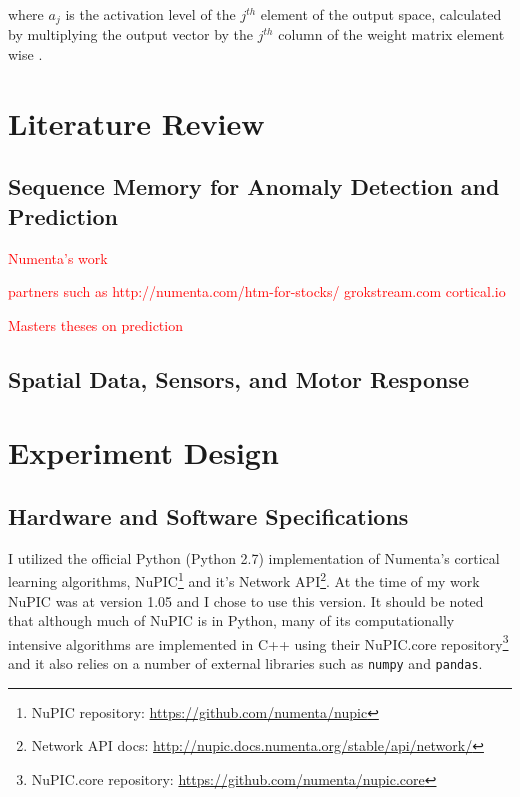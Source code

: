 \documentclass[oneside,12pt,openany]{book}
\begin{document}
	
	 \noindent where $a_{j}$ is the activation level of the $j^{th}$ element of the output space, calculated by multiplying the output vector by the $j^{th}$ column of the weight matrix element wise \cite{Dillon}. 
	
	\chapter{Literature Review}
	
	\section{Sequence Memory for Anomaly Detection and Prediction}
	
	\textcolor{red}{Numenta's work}
	
	\textcolor{red}{partners such as http://numenta.com/htm-for-stocks/ grokstream.com cortical.io}
	
	\textcolor{red}{Masters theses on prediction}
	
	\section{Spatial Data, Sensors, and Motor Response}
	
	\chapter{Experiment Design}
	
	\section{Hardware and Software Specifications}
	
	I utilized the official Python (Python 2.7) implementation of Numenta's cortical learning algorithms, NuPIC\footnote{NuPIC repository: \href{https://github.com/numenta/nupic}{\ttfamily https://github.com/numenta/nupic} } and it's Network API\footnote{Network API docs: \href{http://nupic.docs.numenta.org/stable/api/network/}{\ttfamily http://nupic.docs.numenta.org/stable/api/network/}}. At the time of my work NuPIC was at version 1.05 and I chose to use this version. It should be noted that although much of NuPIC is in Python, many of its computationally intensive algorithms are implemented in C++ using their NuPIC.core repository\footnote{NuPIC.core repository: \href{https://github.com/numenta/nupic.core}{\ttfamily https://github.com/numenta/nupic.core}} and it also relies on a number of external libraries such as \texttt{numpy} and \texttt{pandas}. 
	
\end{document}
